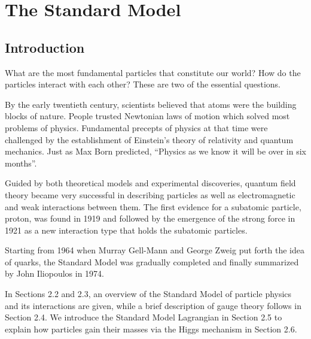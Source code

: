 
\chapter{The Standard Model}


\label{ch:sm}


\section{Introduction}
\par What are the most fundamental particles that constitute our world? How do the particles interact with each other?
These are two of the essential questions.


\par By the early twentieth century, scientists believed that atoms were the building blocks of nature. People trusted Newtonian laws of motion which solved most problems of physics.
Fundamental precepts of physics at that time were challenged by the establishment of Einstein's theory of relativity and quantum mechanics.
Just as Max Born predicted, ``Physics as we know it will be over in six months''.


\par Guided by both theoretical models and experimental discoveries, quantum field theory became very successful in describing particles as well as electromagnetic and weak interactions between them. The first evidence for a subatomic particle, proton, was found in 1919 and followed by the emergence of the strong force in 1921 as a new interaction type that holds the subatomic particles. 


\par Starting from 1964 when Murray Gell-Mann and George Zweig put forth the idea of quarks, 
the Standard Model was gradually completed and finally summarized by John Iliopoulos in 1974.


\par In Sections 2.2 and 2.3, an overview of the Standard Model of particle physics and its interactions are given, while
a brief description of gauge theory follows in Section 2.4. We introduce the Standard Model Lagrangian in Section 2.5 to explain how particles gain their masses via the Higgs mechanism in Section 2.6.


